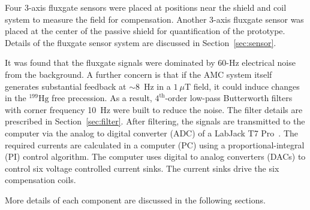 Four 3-axis fluxgate sensors were placed at positions near the shield and coil system to measure the field for compensation. Another 3-axis fluxgate sensor was placed at the center of the passive shield for quantification of the prototype. Details of the fluxgate sensor system are discussed in Section~\ref{sec:sensor}.




It was found that the fluxgate signals were dominated by 60-Hz electrical noise from the background. A further concern is that if the AMC system itself generates substantial feedback at $\sim8$~Hz in a $1~\mu$T field, it could induce changes in the $\mathrm{^{199}Hg}$ free precession. As a result, $\mathrm{4^{th}}$-order low-pass Butterworth filters with corner frequency 10~Hz were built to reduce the noise. The filter details are prescribed in Section~\ref{sec:filter}. After filtering, the signals are transmitted to the computer via the analog to digital converter (ADC) of a LabJack T7 Pro~\cite{T7}. The required currents are calculated in a computer (PC) using a proportional-integral (PI) control algorithm. The computer uses digital to analog converters (DACs) to control six voltage controlled current sinks. The current sinks drive the six compensation coils.

More details of each component are discussed in the following sections.

